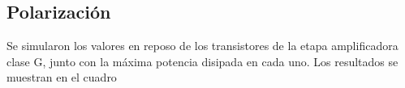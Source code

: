 
\subsection{Polarización}

\par Se simularon los valores en reposo de los transistores de la etapa amplificadora clase G, junto con la máxima potencia disipada en cada uno. Los resultados se muestran en el cuadro ~\\


